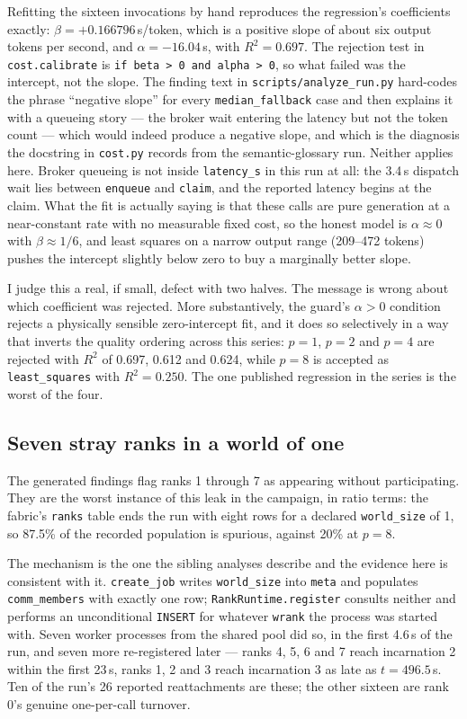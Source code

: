 \documentclass[11pt]{article}
\begin{document}
Refitting the sixteen invocations by hand reproduces the regression's coefficients exactly:
$\beta=+0.166796$\,s/token, which is a positive slope of about six output tokens per second, and
$\alpha=-16.04$\,s, with $R^2=0.697$. The rejection test in \texttt{cost.calibrate} is
\texttt{if beta > 0 and alpha > 0}, so what failed was the intercept, not the slope. The finding
text in \texttt{scripts/analyze\_run.py} hard-codes the phrase ``negative slope'' for every
\texttt{median\_fallback} case and then explains it with a queueing story --- the broker wait
entering the latency but not the token count --- which would indeed produce a negative slope, and
which is the diagnosis the docstring in \texttt{cost.py} records from the semantic-glossary run.
Neither applies here. Broker queueing is not inside \texttt{latency\_s} in this run at all: the
3.4\,s dispatch wait lies between \texttt{enqueue} and \texttt{claim}, and the reported latency
begins at the claim. What the fit is actually saying is that these calls are pure generation at a
near-constant rate with no measurable fixed cost, so the honest model is $\alpha\approx0$ with
$\beta\approx1/6$, and least squares on a narrow output range (209--472 tokens) pushes the
intercept slightly below zero to buy a marginally better slope.

I judge this a real, if small, defect with two halves. The message is wrong about which
coefficient was rejected. More substantively, the guard's $\alpha>0$ condition rejects a
physically sensible zero-intercept fit, and it does so selectively in a way that inverts the
quality ordering across this series: $p=1$, $p=2$ and $p=4$ are rejected with $R^2$ of 0.697,
0.612 and 0.624, while $p=8$ is accepted as \texttt{least\_squares} with $R^2=0.250$. The one
published regression in the series is the worst of the four.

\subsection*{Seven stray ranks in a world of one}

The generated findings flag ranks 1 through 7 as appearing without participating. They are the
worst instance of this leak in the campaign, in ratio terms: the fabric's \texttt{ranks} table
ends the run with eight rows for a declared \texttt{world\_size} of 1, so 87.5\% of the recorded
population is spurious, against 20\% at $p=8$.

The mechanism is the one the sibling analyses describe and the evidence here is consistent with
it. \texttt{create\_job} writes \texttt{world\_size} into \texttt{meta} and populates
\texttt{comm\_members} with exactly one row; \texttt{RankRuntime.register} consults neither and
performs an unconditional \texttt{INSERT} for whatever \texttt{wrank} the process was started
with. Seven worker processes from the shared pool did so, in the first 4.6\,s of the run, and
seven more re-registered later --- ranks 4, 5, 6 and 7 reach incarnation 2 within the first 23\,s,
ranks 1, 2 and 3 reach incarnation 3 as late as $t=496.5$\,s. Ten of the run's 26 reported
reattachments are these; the other sixteen are rank 0's genuine one-per-call turnover.
\end{document}
